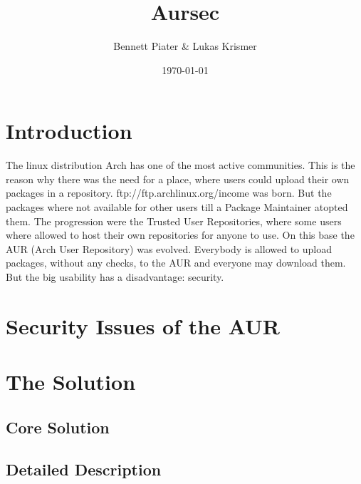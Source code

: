\documentclass{scrartcl}
\title{Aursec}
\author{Bennett Piater \& Lukas Krismer}
\date{\today}
\begin{document}
  \thispagestyle{empty}

  


  \begin{abstract}
  \end{abstract}

  \tableofcontents
  \listoffigures
  \listoftables
  \pagebreak


  \section{Introduction}
  The linux distribution Arch has one of the most active communities. This is the reason why there was the need for a place, where users could upload their own packages in a repository.
  ftp://ftp.archlinux.org/income was born. But the packages where not available for other users till a Package Maintainer atopted them.
  The progression were the Trusted User Repositories, where some users where allowed to host their own repositories for anyone to use. On this base the AUR (Arch User Repository) was evolved.
  Everybody is allowed to upload packages, without any checks, to the AUR and everyone may download them. But the big usability has a disadvantage: security. \cite{wiki:AUR} %


  \section{Security Issues of the AUR}
  
  \section{The Solution}
    \subsection{Core Solution}
    \subsection{Detailed Description}
\end{document}
